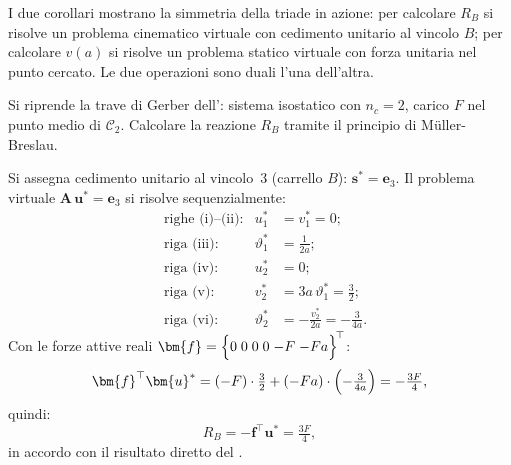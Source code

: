 \begin{esempio}
\begin{svolgimento}
	\begin{oss}
		I due corollari mostrano la simmetria della triade
		in azione: per calcolare $R_B$ si risolve un problema
		cinematico virtuale con cedimento unitario al vincolo
		$B$; per calcolare $v(a)$ si risolve un problema
		statico virtuale con forza unitaria nel punto cercato.
		Le due operazioni sono duali l'una dell'altra.
	\end{oss}
	
\end{svolgimento}
\end{esempio}


\begin{esempio}
	\label{ex:gerber_PLV}
	Si riprende la trave di Gerber
	dell': sistema isostatico con
	$n_c = 2$, carico $F$ nel punto medio di $\mathcal{C}_2$.
	Calcolare la reazione $R_B$ tramite il principio di
	Müller-Breslau.


\begin{svolgimento}
	
	Si assegna cedimento unitario al vincolo~3
	(carrello $B$): $\bm{s}^* = \bm{e}_3$.
	Il problema virtuale $\bm{A}\,\bm{u}^* = \bm{e}_3$
	si risolve sequenzialmente:
	\begin{align*}
		&\text{righe (i)--(ii):} & u_1^* &= v_1^* = 0;\\
		&\text{riga (iii):} & \vartheta_1^* &= \tfrac{1}{2a};\\
		&\text{riga (iv):} & u_2^* &= 0;\\
		&\text{riga (v):} & v_2^* &= 3a\,\vartheta_1^*
		= \tfrac{3}{2};\\
		&\text{riga (vi):} & \vartheta_2^* &=
		-\tfrac{v_2^*}{2a} = -\tfrac{3}{4a}.
	\end{align*}
	Con le forze attive reali
	$\bm{f} = \Bigl\{0\; 0\; 0\; 0\;
	{-F}\; {-Fa}\Bigr\}^{\!\top}$:
	\begin{equation*}
		\bm{f}^{\top}\bm{u}^* =
		(-F)\cdot\tfrac{3}{2} + (-Fa)\cdot
		\Bigl(-\tfrac{3}{4a}\Bigr)
		= -\tfrac{3F}{4},
	\end{equation*}
	quindi:
	\begin{equation*}
		R_B = -\bm{f}^{\top}\bm{u}^* = \tfrac{3F}{4},
	\end{equation*}
	in accordo con il risultato diretto del
	.
	
\end{svolgimento}
\end{esempio}



